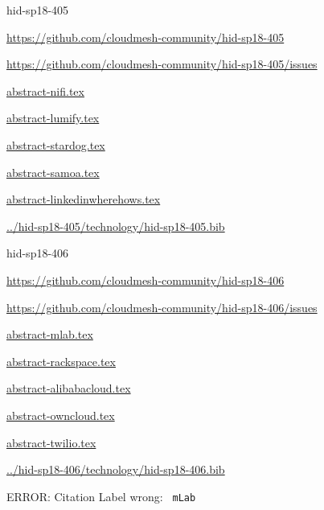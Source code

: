\begin{IU}

hid-sp18-405

\url{https://github.com/cloudmesh-community/hid-sp18-405}

\url{https://github.com/cloudmesh-community/hid-sp18-405/issues}

\href{https://github.com/cloudmesh-community/hid-sp18-405/blob/master//technology/abstract-nifi.tex}{abstract-nifi.tex}

\href{https://github.com/cloudmesh-community/hid-sp18-405/blob/master//technology/abstract-lumify.tex}{abstract-lumify.tex}

\href{https://github.com/cloudmesh-community/hid-sp18-405/blob/master//technology/abstract-stardog.tex}{abstract-stardog.tex}

\href{https://github.com/cloudmesh-community/hid-sp18-405/blob/master//technology/abstract-samoa.tex}{abstract-samoa.tex}

\href{https://github.com/cloudmesh-community/hid-sp18-405/blob/master//technology/abstract-linkedinwherehows.tex}{abstract-linkedinwherehows.tex}

\href{https://github.com/cloudmesh-community/hid-sp18-405/blob/master//technology/hid-sp18-405.bib}{../hid-sp18-405/technology/hid-sp18-405.bib}

\end{IU}


\begin{IU}

hid-sp18-406

\url{https://github.com/cloudmesh-community/hid-sp18-406}

\url{https://github.com/cloudmesh-community/hid-sp18-406/issues}

\href{https://github.com/cloudmesh-community/hid-sp18-406/blob/master//technology/abstract-mlab.tex}{abstract-mlab.tex}

\href{https://github.com/cloudmesh-community/hid-sp18-406/blob/master//technology/abstract-rackspace.tex}{abstract-rackspace.tex}

\href{https://github.com/cloudmesh-community/hid-sp18-406/blob/master//technology/abstract-alibabacloud.tex}{abstract-alibabacloud.tex}

\href{https://github.com/cloudmesh-community/hid-sp18-406/blob/master//technology/abstract-owncloud.tex}{abstract-owncloud.tex}

\href{https://github.com/cloudmesh-community/hid-sp18-406/blob/master//technology/abstract-twilio.tex}{abstract-twilio.tex}

\href{https://github.com/cloudmesh-community/hid-sp18-406/blob/master//technology/hid-sp18-406.bib}{../hid-sp18-406/technology/hid-sp18-406.bib}

 ERROR: Citation Label wrong: \verb| mLab |

\end{IU}


